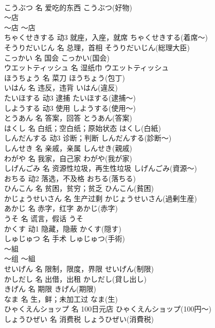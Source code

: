 \documentclass[8pt]{extreport}
\begin{document}
\begin{CJK}{UTF8}{min}
\\	こうぶつ	名	爱吃的东西	こうぶつ(好物)	
\\	～店	
\\	～店	～店	
\\	ちゃくせきする	动3	就座，入座，就席	ちゃくせきする(着席～)	
\\	そうりだいじん	名	总理，首相	そうりだいじん(総理大臣)	
\\	こっかい	名	国会	こっかい(国会)	
\\	ウエットティッシュ	名	湿纸巾	ウエットティッシュ	
\\	ほうちょう	名	菜刀	ほうちょう(包丁)	
\\	いはん	名	违反，违背	いはん(違反)	
\\	たいほする	动3	逮捕	たいほする(逮捕～)	
\\	しようする	动3	使用	しようする(使用～)	
\\	とうあん	名	答案，回答	とうあん(答案)	
\\	はくし	名	白纸；空白纸；原始状态	はくし(白紙)	
\\	しんだんする	动3	诊断；判断	しんだんする(診断～)	
\\	しんせき	名	亲戚，亲属	しんせき(親戚)	
\\	わがや	名	我家，自己家	わがや(我が家)	
\\	しげんごみ	名	资源性垃圾，再生性垃圾	しげんごみ(資源～)	
\\	おちる	动2	落选，不及格	おちる(落ちる)	
\\	ひんこん	名	贫困，贫穷；贫乏	ひんこん(貧困)	
\\	かじょうせいさん	名	生产过剩	かじょうせいさん(過剰生産)	
\\	あかじ	名	赤字，红字	あかじ(赤字)	
\\	うそ	名	谎言，假话	うそ	
\\	かくす	动1	隐藏，隐蔽	かくす(隠す)	
\\	しゅじゅつ	名	手术	しゅじゅつ(手術)	
\\	～組	
\\	～组	～組	
\\	せいげん	名	限制，限度，界限	せいげん(制限)	
\\	かしだし	名	出借，出租	かしだし(貸し出し)	
\\	きげん	名	期限	きげん(期限)	
\\	なま	名	生，鲜；未加工过	なま(生)	
\\	ひゃくえんショップ	名	100日元店	ひゃくえんショップ(100円～)	
\\	しょうひぜい	名	消费税	しょうひぜい(消費税)	

\end{CJK}
\end{document}
